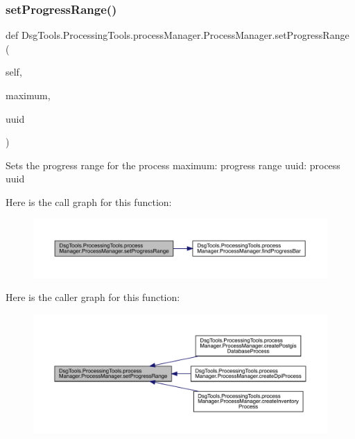 \subsubsection{\texorpdfstring{set\+Progress\+Range()}{setProgressRange()}}
{\footnotesize\ttfamily def Dsg\+Tools.\+Processing\+Tools.\+process\+Manager.\+Process\+Manager.\+set\+Progress\+Range (\begin{DoxyParamCaption}\item[{}]{self,  }\item[{}]{maximum,  }\item[{}]{uuid }\end{DoxyParamCaption})}

\begin{DoxyVerb}Sets the progress range for the process
maximum: progress range
uuid: process uuid
\end{DoxyVerb}
 Here is the call graph for this function\+:
\nopagebreak
\begin{figure}[H]
\begin{center}
\leavevmode
\includegraphics[width=350pt]{class_dsg_tools_1_1_processing_tools_1_1process_manager_1_1_process_manager_a6b891be03fdd827eff9a157038560cd2_cgraph}
\end{center}
\end{figure}
Here is the caller graph for this function\+:
\nopagebreak
\begin{figure}[H]
\begin{center}
\leavevmode
\includegraphics[width=350pt]{class_dsg_tools_1_1_processing_tools_1_1process_manager_1_1_process_manager_a6b891be03fdd827eff9a157038560cd2_icgraph}
\end{center}
\end{figure}
\mbox{\label{class_dsg_tools_1_1_processing_tools_1_1process_manager_1_1_process_manager_a9b8eea4c358a48a612ac8f2d285708b4}} 
